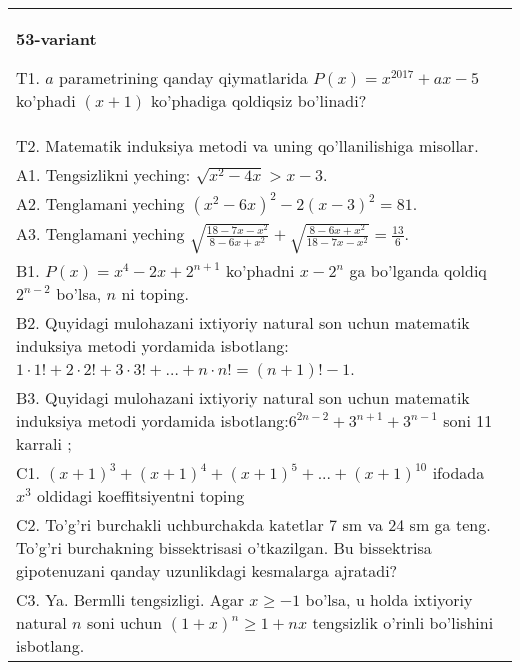 \documentclass{article}
\begin{document}
\begin{tabular}{m{17cm}}
\textbf{53-variant}
\newline

T1. \(a\) parametrining qanday qiymatlarida \(P(x) = x^{2017} + ax - 5\) ko'phadi \((x + 1)\) ko'phadiga qoldiqsiz bo'linadi? \\
T2. Matematik induksiya metodi va uning qo'llanilishiga misollar. \\
A1. Tengsizlikni yeching: \(\sqrt{x^{2} - 4x} > x - 3\). \\
A2. Tenglamani yeching \(\left( x^{2} - 6x \right)^{2} - 2(x - 3)^{2} = 81\). \\
A3. Tenglamani yeching \(\sqrt{\frac{18 - 7x - x^{2}}{8 - 6x + x^{2}}} + \sqrt{\frac{8 - 6x + x^{2}}{18 - 7x - x^{2}}} = \frac{13}{6}\). \\
B1. \(P(x) = x^{4} - 2x + 2^{n + 1}\) ko'phadni \(x - 2^{n}\) ga bo'lganda qoldiq \(2^{n - 2}\) bo'lsa, \(n\) ni toping. \\
B2. Quyidagi mulohazani ixtiyoriy natural son uchun matematik induksiya metodi yordamida isbotlang: \(1 \cdot 1! + 2 \cdot 2! + 3 \cdot 3! + \ldots + n \cdot n! = (n + 1)! - 1\). \\
B3. Quyidagi mulohazani ixtiyoriy natural son uchun matematik induksiya metodi yordamida isbotlang:\(6^{2n - 2} + 3^{n + 1} + 3^{n - 1}\) soni 11 karrali ; \\
C1. \((x + 1)^{3} + (x + 1)^{4} + (x + 1)^{5} + ... + (x + 1)^{10}\) ifodada \(x^{3}\) oldidagi koeffitsiyentni toping \\
C2. To'g'ri burchakli uchburchakda katetlar 7 sm va 24 sm ga teng. To'g'ri burchakning bissektrisasi o'tkazilgan. Bu bissektrisa gipotenuzani qanday uzunlikdagi kesmalarga ajratadi? \\
C3. Ya. Bermlli tengsizligi. Agar \(x \geq - 1\) bo'lsa, u holda ixtiyoriy natural \(n\) soni uchun \((1 + x)^{n} \geq 1 + nx\) tengsizlik o'rinli bo'lishini isbotlang. \\

\end{tabular}
\vspace{1cm}
\end{document}
